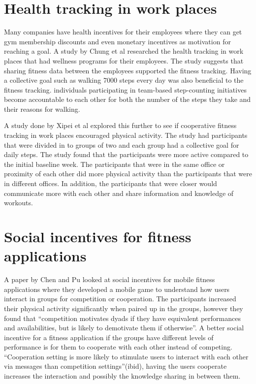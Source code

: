 \section{Health tracking in work places}
Many companies have health incentives for their employees where they can get gym membership discounts and even monetary incentives as motivation for reaching a goal. A study by Chung et al\cite{Chung2017} researched the health tracking in work places that had wellness programs for their employees. The study suggests that sharing fitness data between the employees supported the fitness tracking. Having a collective goal such as walking 7000 steps every day was also beneficial to the fitness tracking.  individuals participating in team-based step-counting initiatives become accountable to each other for both the number of the steps they take and their reasons for walking. \cite{Buis2009}

A study done by Xipei et al\cite{Ren2018} explored this further to see if cooperative fitness tracking in work places encouraged physical activity. The study had participants that were divided in to groups of two and each group had a collective goal for daily steps. The study found that the participants were more active compared to the initial baseline week. The participants that were in the same office or proximity of each other did more physical activity than the participants that were in different offices. In addition, the participants that were closer would communicate more with each other and share information and knowledge of workouts. 

\section{Social incentives for fitness applications}
A paper by Chen and Pu\cite{Chen2017} looked at social incentives for mobile fitness applications where they developed a mobile game to understand how users interact in groups for competition or cooperation. The participants increased their physical activity significantly when paired up in the groups, however they found that “competition motivates dyads if they have equivalent performances and availabilities, but is likely to demotivate them if otherwise”\cite{Chen2017}. A better social incentive for a fitness application if the groups have different levels of performance is for them to cooperate with each other instead of competing.  “Cooperation setting is more likely to stimulate users to interact with each other via messages than competition settings”(ibid), having the users cooperate increases the interaction and possibly the knowledge sharing in between them.

